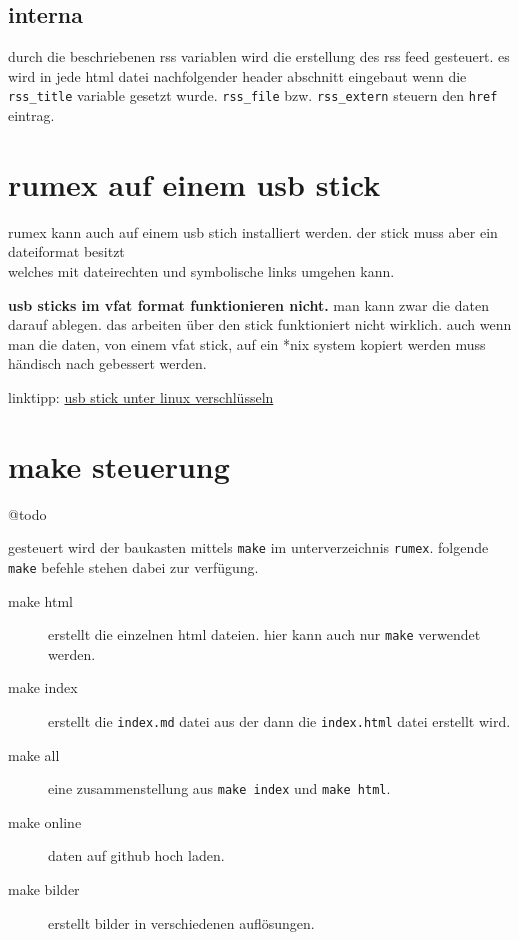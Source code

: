 \subsection{interna}\label{interna}

durch die beschriebenen rss variablen wird die erstellung des rss feed
gesteuert. es wird in jede html datei nachfolgender header abschnitt
eingebaut wenn die \texttt{rss\_title} variable gesetzt wurde.
\texttt{rss\_file} bzw. \texttt{rss\_extern} steuern den \texttt{href}
eintrag.


\section{rumex auf einem usb stick}\label{rumex-auf-einem-usb-stick}

rumex kann auch auf einem usb stich installiert werden. der stick muss
aber ein dateiformat besitzt\\welches mit dateirechten und symbolische
links umgehen kann.

\textbf{usb sticks im vfat format funktionieren nicht.} man kann zwar
die daten darauf ablegen. das arbeiten über den stick funktioniert nicht
wirklich. auch wenn man die daten, von einem vfat stick, auf ein *nix
system kopiert werden muss händisch nach gebessert werden.

linktipp:
\href{http://www.it-bayer.de/usb-stick.html?suchwort=versch\#usb-stick-unter-linux-verschl\%c3\%bcsseln}{usb
stick unter linux verschlüsseln}

\section{make steuerung}\label{make-steuerung}

@todo

gesteuert wird der baukasten mittels \texttt{make} im unterverzeichnis
\texttt{rumex}. folgende \texttt{make} befehle stehen dabei zur
verfügung.

\begin{description}
\item[make html]
erstellt die einzelnen html dateien. hier kann auch nur \texttt{make}
verwendet werden.
\item[make index]
erstellt die \texttt{index.md} datei aus der dann die
\texttt{index.html} datei erstellt wird.
\item[make all]
eine zusammenstellung aus \texttt{make index} und \texttt{make html}.
\item[make online]
daten auf github hoch laden.
\item[make bilder]
erstellt bilder in verschiedenen auflösungen.
\end{description}

